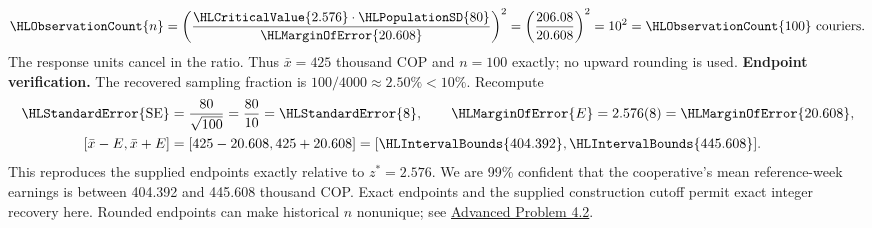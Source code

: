 \[\HLObservationCount{n}=\left(\frac{\HLCriticalValue{2.576}\cdot\HLPopulationSD{80}}{\HLMarginOfError{20.608}}\right)^2=\left(\frac{206.08}{20.608}\right)^2=10^2=\HLObservationCount{100}\text{ couriers}.\]
The response units cancel in the ratio. Thus $\bar x=425$ thousand COP and $n=100$ exactly; no upward rounding is used.
\textbf{Endpoint verification.} The recovered sampling fraction is $100/4000\approx 2.50\%<10\%$. Recompute
\[\begin{aligned}
\HLStandardError{\mathrm{SE}}&=\frac{80}{\sqrt{100}}=\frac{80}{10}=\HLStandardError{8},\qquad \HLMarginOfError{E}=2.576(8)=\HLMarginOfError{20.608},\\
[\bar x-E,\bar x+E]&=[425-20.608,425+20.608]=[\HLIntervalBounds{404.392},\HLIntervalBounds{445.608}].
\end{aligned}\]
This reproduces the supplied endpoints exactly relative to $z^*=2.576$. We are 99\% confident that the cooperative's mean reference-week earnings is between 404.392 and 445.608 thousand COP.
Exact endpoints and the supplied construction cutoff permit exact integer recovery here. Rounded endpoints can make historical $n$ nonunique; see \hyperref[prob:c4-advanced-2]{Advanced Problem 4.2}.
\clearpage
